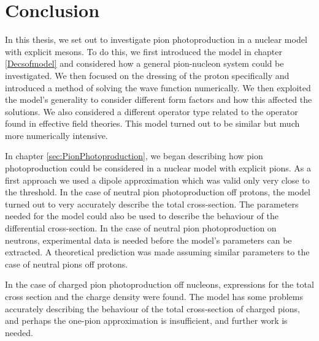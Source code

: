 \chapter{Conclusion}
In this thesis, we set out to investigate pion photoproduction in a nuclear model with explicit mesons. To do this, we first introduced the model in chapter \ref{Decsofmodel} and considered how a general pion-nucleon system could be investigated. We then focused on the dressing of the proton specifically and introduced a method of solving the wave function numerically. We then exploited the model's generality to consider different form factors and how this affected the solutions. We also considered a different operator type related to the operator found in effective field theories. This model turned out to be similar but much more numerically intensive. 

In chapter \ref{sec:PionPhotoproduction}, we began describing how pion photoproduction could be considered in a nuclear model with explicit pions. As a first approach we used a dipole approximation which was valid only very close to the threshold. In the case of neutral pion photoproduction off protons, the model turned out to very accurately describe the total cross-section. The parameters needed for the model could also be used to describe the behaviour of the differential cross-section. In the case of neutral pion photoproduction on neutrons, experimental data is needed before the model's parameters can be extracted. A theoretical prediction was made assuming similar parameters to the case of neutral pions off protons. 

In the case of charged pion photoproduction off nucleons, expressions for the total cross section and the charge density were found. The model has some problems accurately describing the behaviour of the total cross-section of charged pions, and perhaps the one-pion approximation is insufficient, and further work is needed. 